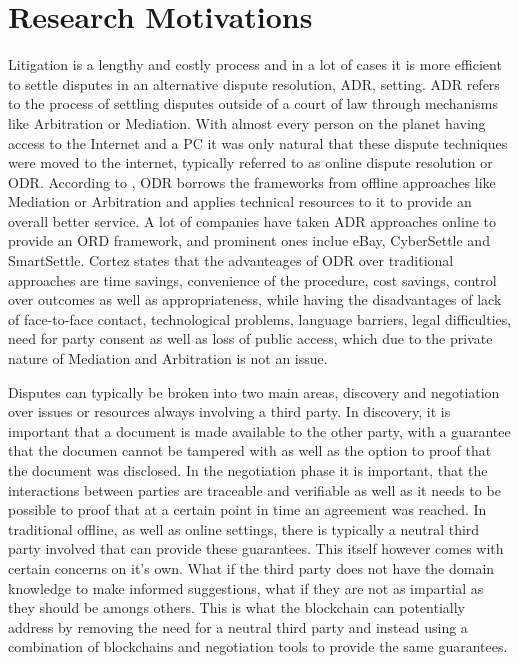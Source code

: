 \documentclass[12pt,msc,a4paper,oneside]{ucl_thesis}
\begin{document}
\section{Research Motivations}
Litigation is a lengthy and costly process and in a lot of cases it is more efficient to settle disputes in an alternative dispute resolution, ADR, setting. ADR refers to the process of settling disputes outside of a court of law through mechanisms like Arbitration or Mediation. With almost every person on the planet having access to the Internet and a PC it was only natural that these dispute techniques were moved to the internet, typically referred to as online dispute resolution or ODR. According to \cite{katsh:odr}, ODR borrows the frameworks from offline approaches like Mediation or Arbitration and applies technical resources to it to provide an overall better service. A lot of companies have taken ADR approaches online to provide an ORD framework, and prominent ones inclue eBay, CyberSettle and SmartSettle. Cortez \cite{cortes2011online} states that the advanteages of ODR over traditional approaches are time savings, convenience of the procedure, cost savings, control over outcomes as well as appropriateness, while having the disadvantages of lack of face-to-face contact, technological problems, language barriers, legal difficulties, need for party consent as well as loss of public access, which due to the private nature of Mediation and Arbitration is not an issue.

Disputes can typically be broken into two main areas, discovery and negotiation over issues or resources always involving a third party. In discovery, it is important that a document is made available to the other party, with a guarantee that the documen cannot be tampered with as well as the option to proof that the document was disclosed. In the negotiation phase it is important, that the interactions between parties are traceable and verifiable as well as it needs to be possible to proof that at a certain point in time an agreement was reached. In traditional offline, as well as online settings, there is typically a neutral third party involved that can provide these guarantees. This itself however comes with certain concerns on it's own. What if the third party does not have the domain knowledge to make informed suggestions, what if they are not as impartial as they should be amongs others. This is what the blockchain can potentially address by removing the need for a neutral third party and instead using a combination of blockchains and negotiation tools to provide the same guarantees.
\end{document}
